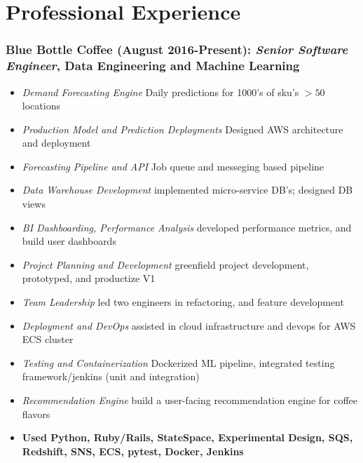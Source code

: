 \documentclass[a4paper,10pt,notitlepage]{article}
\begin{document}
\vspace{-10pt}\section*{Professional Experience}

\subsubsection*{Blue Bottle Coffee (August 2016-Present): \textit{Senior Software Engineer}, Data Engineering and Machine Learning}
  \begin{itemize}
    \vspace{-5pt}\item  \textit{Demand Forecasting Engine} Daily predictions for 1000's of sku's $>50$ locations
    \vspace{-5pt}\item  \textit{Production Model and Prediction Deployments} Designed AWS architecture and deployment
    \vspace{-5pt}\item  \textit{Forecasting Pipeline and API} Job queue and messeging based pipeline
    \vspace{-5pt}\item  \textit{Data Warehouse Development} implemented micro-service DB's; designed DB views
    \vspace{-5pt}\item  \textit{BI Dashboarding, Performance Analysis} developed performance metrics, and build user dashboards
    \vspace{-5pt}\item  \textit{Project Planning and Development} greenfield project development, prototyped, and productize V1
    \vspace{-5pt}\item  \textit{Team Leadership} led two engineers in refactoring, and feature development
    \vspace{-5pt}\item  \textit{Deployment and DevOps} assisted in cloud infrastructure and devops for AWS ECS cluster
    \vspace{-5pt}\item  \textit{Testing and Containerization} Dockerized ML pipeline, integrated testing framework/jenkins (unit and integration)
    \vspace{-5pt}\item  \textit{Recommendation Engine} build a user-facing recommendation engine for coffee flavors
    \vspace{-5pt}\item  \textbf{Used Python, Ruby/Rails, StateSpace, Experimental Design, SQS, Redshift, SNS, ECS, pytest, Docker, Jenkins}
  \end{itemize}
\end{document}
